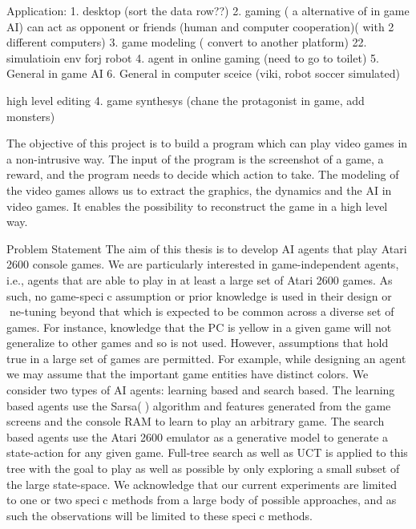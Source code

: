 Application:
1. desktop (sort the data row??)
2. gaming ( a alternative of in game AI) can act as opponent or friends (human and computer cooperation)( with 2 different computers)
3. game modeling ( convert to another platform)
22. simulatioin env forj robot
4. agent in online gaming (need to go to toilet)
5. General in game AI
6. General in computer sceice (viki, robot soccer simulated)

high level editing
4. game synthesys (chane the protagonist in game, add monsters)

The objective of this project is to build a program which can play video games 
in a non-intrusive way. The input of the program is the screenshot of a game, a reward,
and the program needs to decide which action to take.
The modeling of the video games allows us to extract the graphics, the dynamics
and the AI in video games. It enables the possibility to reconstruct the game in 
a high level way. 

Problem Statement
The aim of this thesis is to develop AI agents that play Atari 2600 console games. We
are particularly interested in game-independent agents, i.e., agents that are able to play
in at least a large set of Atari 2600 games. As such, no game-specic assumption or prior
knowledge is used in their design or ne-tuning beyond that which is expected to be common
across a diverse set of games. For instance, knowledge that the PC is yellow in a given game
will not generalize to other games and so is not used. However, assumptions that hold true
in a large set of games are permitted. For example, while designing an agent we may assume
that the important game entities have distinct colors.
We consider two types of AI agents: learning based and search based. The learning
based agents use the Sarsa() algorithm and features generated from the game screens and
the console RAM to learn to play an arbitrary game. The search based agents use the
Atari 2600 emulator as a generative model to generate a state-action for any given game.
Full-tree search as well as UCT is applied to this tree with the goal to play as well as
possible by only exploring a small subset of the large state-space. We acknowledge that our
current experiments are limited to one or two specic methods from a large body of possible
approaches, and as such the observations will be limited to these specic methods.


